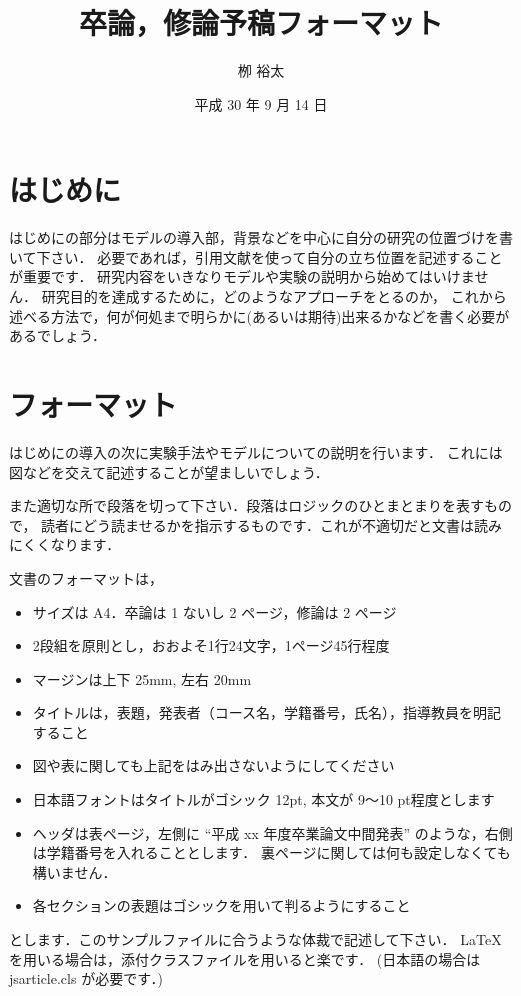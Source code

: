 \documentclass[twocolumn, a4paper, uplatex]{UECIEresume}
\title{卒論，修論予稿フォーマット}
\date{平成 30 年 9 月 14 日}
\affiliation{総合情報学科 メディア情報学 コース}
\author{栁 裕太}
\begin{document}
\maketitle

\section{はじめに}
はじめにの部分はモデルの導入部，背景などを中心に自分の研究の位置づけを書いて下さい．
必要であれば，引用文献を使って自分の立ち位置を記述することが重要です．
研究内容をいきなりモデルや実験の説明から始めてはいけません．
研究目的を達成するために，どのようなアプローチをとるのか，
これから述べる方法で，何が何処まで明らかに(あるいは期待)出来るかなどを書く必要があるでしょう．

\section{フォーマット}
はじめにの導入の次に実験手法やモデルについての説明を行います．
これには図などを交えて記述することが望ましいでしょう．

また適切な所で段落を切って下さい．段落はロジックのひとまとまりを表すもので，
読者にどう読ませるかを指示するものです．これが不適切だと文書は読みにくくなります．

文書のフォーマットは，
\begin{itemize}
  \item{サイズは A4．卒論は 1 ないし 2 ページ，修論は 2 ページ}
  \item{2段組を原則とし，おおよそ1行24文字，1ページ45行程度}
  \item{マージンは上下 25mm, 左右 20mm}
  \item{タイトルは，表題，発表者（コース名，学籍番号，氏名），指導教員を明記すること}
  \item{図や表に関しても上記をはみ出さないようにしてください}
  \item{日本語フォントはタイトルがゴシック 12pt, 本文が 9〜10 pt程度とします}
  \item{ヘッダは表ページ，左側に ``平成 xx 年度卒業論文中間発表'' のような，右側は学籍番号を入れることとします．
      裏ページに関しては何も設定しなくても構いません．
    }
  \item{各セクションの表題はゴシックを用いて判るようにすること}
\end{itemize}
とします．このサンプルファイルに合うような体裁で記述して下さい．
\LaTeX を用いる場合は，添付クラスファイルを用いると楽です．
(日本語の場合は jsarticle.cls が必要です．)
\end{document}
